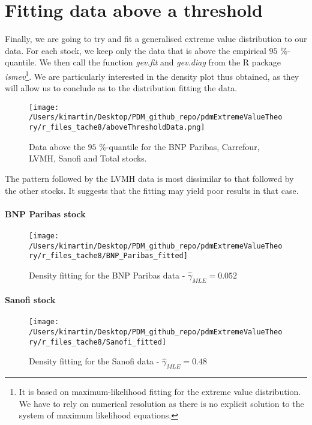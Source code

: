 \section{Fitting data above a threshold}
Finally, we are going to try and fit a generalised extreme value distribution to our data. For each stock, we keep only the data that is above the empirical $95$ \%-quantile. We then call the function \textit{gev.fit} and \textit{gev.diag} from the R package \textit{ismev}\footnote{It is based on maximum-likelihood fitting for the extreme value distribution. We have to rely on numerical resolution as there is no explicit solution to the system of maximum likelihood equations.}. We are particularly interested in the density plot thus obtained, as they will allow us to conclude as to the distribution fitting the data.
\begin{figure}[h!]
	\centering
	\texttt{[image: /Users/kimartin/Desktop/PDM\_github\_repo/pdmExtremeValueTheory/r\_files\_tache8/aboveThresholdData.png]}
	\caption{Data above the  $95$ \%-quantile for the BNP Paribas, Carrefour, LVMH, Sanofi and Total stocks.}
	\label{fig:dataAboveThreshold}
\end{figure}

The pattern followed by the LVMH data is most dissimilar to that followed by the other stocks. It suggests that the fitting may yield poor results in that case.
\clearpage
\paragraph{BNP Paribas stock }
\begin{figure}[h!]
	\centering
	\texttt{[image: /Users/kimartin/Desktop/PDM\_github\_repo/pdmExtremeValueTheory/r\_files\_tache8/BNP\_Paribas\_fitted]}
	\caption{Density fitting for the BNP Paribas data - $\hat{\gamma}_{MLE} = 0.052$ \\}
	\label{fig:dataAboveThresholdBNPFitted}
\end{figure}
\paragraph{Sanofi stock}
\begin{figure}[h!]
	\centering
	\texttt{[image: /Users/kimartin/Desktop/PDM\_github\_repo/pdmExtremeValueTheory/r\_files\_tache8/Sanofi\_fitted]}
	\caption{Density fitting for the Sanofi data - $\hat{\gamma}_{MLE} = 0.48$ \\}
	\label{fig:dataAboveThresholdSanofiFitted}
\end{figure}
